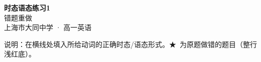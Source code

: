 \documentclass[12pt,a4paper]{article}
\newcommand{\STAR}{\textcolor{wrongred}{\starfont ★}}
\begin{document}
\begin{center}
{\LARGE\bfseries 时态语态练习1}\\[0.25em]
{\large 错题重做}\\[0.35em]
{\footnotesize 上海市大同中学 · 高一英语}
\end{center}

\vspace{-0.2em}
\noindent{\color{rulegray}\rule{\textwidth}{0.8pt}}

\vspace{0.7em}
\noindent{}

\vspace{0.8em}
\noindent 说明：在横线处填入所给动词的正确时态/语态形式。\STAR\ 为原题做错的题目（整行浅红底）。
\end{document}
